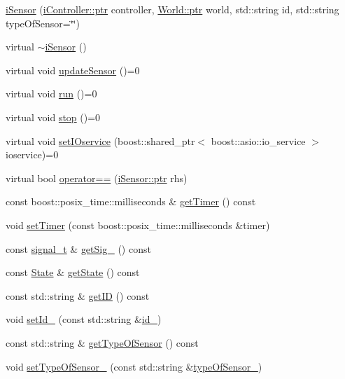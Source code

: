 \begin{DoxyCompactItemize}
\item 
\hyperlink{classo_cpt_1_1i_sensor_a548ca1dbeea64980181c434518659d3e}{i\+Sensor} (\hyperlink{classo_cpt_1_1i_controller_a6d89a95cd6ad68bb74adfaca2f36370f}{i\+Controller\+::ptr} controller, \hyperlink{classo_cpt_1_1_world_aa6e591e3096d5de71e0cec9039663d67}{World\+::ptr} world, std\+::string id, std\+::string type\+Of\+Sensor=\char`\"{}\char`\"{})
\item 
virtual \hyperlink{classo_cpt_1_1i_sensor_a47eeead807cf3dc127fe55df4bc68c47}{$\sim$i\+Sensor} ()
\item 
virtual void \hyperlink{classo_cpt_1_1i_sensor_aa55bc04979e4852989af2bd4f64e70bc}{update\+Sensor} ()=0
\item 
virtual void \hyperlink{classo_cpt_1_1i_sensor_abbface05a16b17354c23389d9747bf7c}{run} ()=0
\item 
virtual void \hyperlink{classo_cpt_1_1i_sensor_aa85c22a8c8f7c2445379e1f82835f8dc}{stop} ()=0
\item 
virtual void \hyperlink{classo_cpt_1_1i_sensor_a83b62cc63498ca4c335f85639e39656d}{set\+I\+Oservice} (boost\+::shared\+\_\+ptr$<$ boost\+::asio\+::io\+\_\+service $>$ ioservice)=0
\item 
virtual bool \hyperlink{classo_cpt_1_1i_sensor_affc8319846828aac6cab641f294a04aa}{operator==} (\hyperlink{classo_cpt_1_1i_sensor_a03533d2c5dc66e332d70dbb3b5e3006a}{i\+Sensor\+::ptr} rhs)
\item 
const boost\+::posix\+\_\+time\+::milliseconds \& \hyperlink{classo_cpt_1_1i_sensor_ab0198a66371e1f20edb8aa876bb69953}{get\+Timer} () const 
\item 
void \hyperlink{classo_cpt_1_1i_sensor_a4c956646ebf60201b5b23e0f5ad288ce}{set\+Timer} (const boost\+::posix\+\_\+time\+::milliseconds \&timer)
\item 
const \hyperlink{classo_cpt_1_1i_sensor_a2e6d170acbc05f0b557bb68671813f6d}{signal\+\_\+t} \& \hyperlink{classo_cpt_1_1i_sensor_a65d4574e71a75c911a73629a05c22d0d}{get\+Sig\+\_\+} () const 
\item 
const \hyperlink{structo_cpt_1_1i_sensor_1_1_state}{State} \& \hyperlink{classo_cpt_1_1i_sensor_aa08600adeeeec0965f6cf0ac46987997}{get\+State} () const 
\item 
const std\+::string \& \hyperlink{classo_cpt_1_1i_sensor_a524a5baf9a771c4f4e540cd030373763}{get\+ID} () const 
\item 
void \hyperlink{classo_cpt_1_1i_sensor_ab3347720d3139b82d6968c03141ddee2}{set\+Id\+\_\+} (const std\+::string \&\hyperlink{classo_cpt_1_1i_sensor_a4c9bd54d193ec8f2cc01eede5eadacdc}{id\+\_\+})
\item 
const std\+::string \& \hyperlink{classo_cpt_1_1i_sensor_a652dcc1d28a0b36856e733f735dae18c}{get\+Type\+Of\+Sensor} () const 
\item 
void \hyperlink{classo_cpt_1_1i_sensor_ab5a881988f2f9b8849892f091b01ed87}{set\+Type\+Of\+Sensor\+\_\+} (const std\+::string \&\hyperlink{classo_cpt_1_1i_sensor_a37396b5c63f5e99cb6e80c266f85dbfa}{type\+Of\+Sensor\+\_\+})
\end{DoxyCompactItemize}
